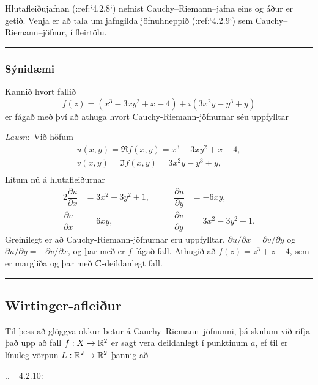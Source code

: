 Hlutafleiðujafnan (:ref:`4.2.8`) nefnist Cauchy--Riemann--jafna eins og
áður er getið.  Venja er að tala um jafngilda 
jöfnuhneppið (:ref:`4.2.9`) sem  Cauchy--Riemann--jöfnur, í fleirtölu.


\bigskip\hrule\bigskip

\subsubsection{Sýnidæmi}  Kannið hvort fallið 
$$
f(z)=(x^3-3xy^2+x-4)+i(3x^2y-y^3+y)
$$
 er fágað með því að athuga hvort
Cauchy-Riemann-jöfnurnar séu uppfylltar

\smallskip\noindent
{\it Lausn}:\   Við höfum
\begin{gather*}
u(x,y)=\Re f(x,y)=x^3-3xy^2+x-4,\\
v(x,y)=\Im f(x,y)=3x^2y-y^3+y,\\
\end{gather*}
Lítum nú á hlutafleiðurnar
\begin{alignat*}{2}
\dfrac{{\partial} u}{{\partial} x}&= 3x^2-3y^2+1, & \qquad
\dfrac{{\partial} u}{{\partial} y}&= -6xy,\\ 
\dfrac{{\partial} v}{{\partial} x}&= 6xy, &\qquad
\dfrac{{\partial} v}{{\partial} y}&= 3x^2-3y^2+1.
\end{alignat*}
Greinilegt er að Cauchy-Riemann-jöfnurnar eru uppfylltar,
${\partial} u/{\partial}x={\partial}v/{\partial}y$ og
${\partial} u/{\partial}y=-{\partial}v/{\partial}x$, og þar með er $f$
fágað fall. Athugið að $f(z)=z^3+z-4$, sem er margliða og þar með
${\mathbb C}$-deildanlegt fall.


\bigskip\hrule\bigskip

\subsection*{Wirtinger-afleiður}


Til þess að glöggva okkur betur á Cauchy--Riemann--jöfnunni, þá skulum
við rifja það upp að fall $f:X\to {\mathbb R}^2$ er sagt vera deildanlegt í
punktinum $a$, ef til er línuleg vörpun $L:{\mathbb R}^2\to {\mathbb R}^2$ þannig að

.. _4.2.10:

